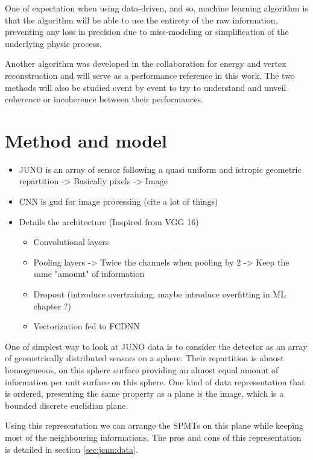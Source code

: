 One of expectation when using data-driven, and so, machine learning algorithm is that the algorithm will be able to use the entirety of the raw information, preventing any loss in precision due to miss-modeling or simplification of the underlying physic process.


Another algorithm was developed in the collaboration for energy and vertex reconstruction \cite{lebrin_towards_2022} and will serve as a performance reference in this work. The two methods will also be studied event by event to try to understand and unveil coherence or incoherence between their performances.


\section{Method and model}
\begin{itemize}
  \item JUNO is an array of sensor following a quasi uniform and istropic geometric repartition -> Basically pixels -> Image
  \item CNN is gud for image processing (cite a lot of things)
  \item Details the architecture (Inspired from VGG 16)
    \begin{itemize}
      \item Convolutional layers
      \item Pooling layers -> Twice the channels when pooling by 2 -> Keep the same "amount" of information
      \item Dropout (introduce overtraining, maybe introduce overfitting in ML chapter ?)
      \item Vectorization fed to FCDNN
    \end{itemize}
\end{itemize}

One of simplest way to look at JUNO data is to consider the detector as an array of geometrically distributed sensors on a sphere. Their repartition is almost homogeneous, on this sphere surface providing an almost equal amount of information per unit surface on this sphere. One kind of data representation that is ordered, presenting the same property as a plane is the image, which is a bounded discrete euclidian plane.

Using this representation we can arrange the SPMTs on this plane while keeping most of the neighbouring informations. The pros and cons of this representation is detailed in section \ref{sec:jcnn:data}.

